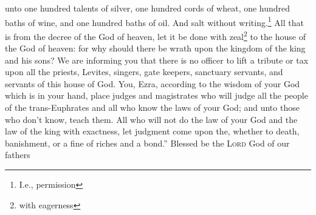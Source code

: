 \begin{enumerate}
     unto one hundred talents of silver, one hundred cords of wheat, one hundred baths of wine, and one hundred baths of oil. And salt without writing.\footnote{I.e., permission}%
     All that is from the decree of the God of heaven, let it be done with zeal\footnote{with eagerness} to the house of the God of heaven: for why should there be wrath upon the kingdom of the king and his sons?%
     We are informing you that there is no officer to lift a tribute or tax upon all the priests, Levites, singers, gate keepers, sanctuary servants, and servants of this house of God.%
     You, Ezra, according to the wisdom of your God which is in your hand, place judges and magistrates who will judge all the people of the trans-Euphrates and all who know the laws of your God; and unto those who don't know, teach them.%
     All who will not do the law of your God and the law of the king with exactness, let judgment come upon the, whether to death, banishment, or a fine of riches and a bond.''%
     Blessed be the \textsc{Lord} God of our fathers%
\end{enumerate}
